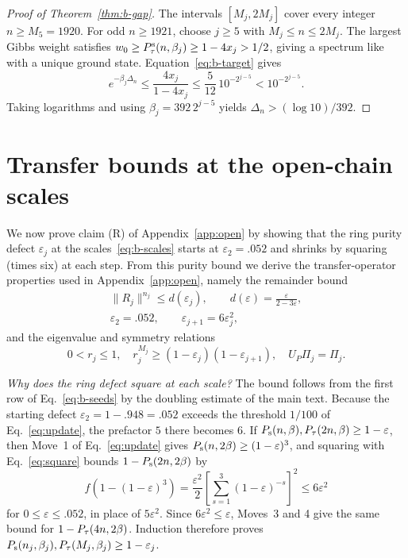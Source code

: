 \documentclass[aps,prl,reprint,amsmath,amssymb,nofootinbib,raggedbottom]{revtex4-2}
\begin{document}
\begin{proof}[Proof of Theorem~\ref{thm:b-gap}]
The intervals $[M_j,2M_j]$ cover every integer $n\ge M_5=1920$.
For odd $n\ge1921$, choose $j\ge5$ with $M_j\le n\le2M_j$.
The largest Gibbs weight satisfies $w_0\ge P_{\tau}^{\mathrm{s}}(n,\beta_j)\ge1-4x_j>1/2$,
giving a spectrum like  with a unique ground state.
Equation~\eqref{eq:b-target} gives
\begin{equation}
 e^{-\beta_j\Delta_n}\le\frac{4x_j}{1-4x_j}
 \le\frac{5}{12}\,10^{-2^{j-5}}<10^{-2^{j-5}}.
 \label{eq:b-gap-final}
\end{equation}
Taking logarithms and using $\beta_j=392\,2^{j-5}$ yields $\Delta_n>(\log10)/392$.
\end{proof}

\section{Transfer bounds at the open-chain scales}\label{app:b-periodic}
We now prove claim (R) of Appendix~\ref{app:open} by showing that the ring
purity defect $\varepsilon_j$ at the scales~\eqref{eq:b-scales} starts at
$\varepsilon_2=.052$ and shrinks by squaring (times six) at each step. From
this purity bound we derive the transfer-operator properties used in
Appendix~\ref{app:open}, namely the remainder bound
\begin{equation}
 \begin{gathered}
 \|R_j\|^{n_j}\le d(\varepsilon_j),\qquad d(\varepsilon)=\frac{\varepsilon}{2-3\varepsilon},\\
 \varepsilon_2=.052,\qquad \varepsilon_{j+1}=6\varepsilon_j^2,
 \end{gathered}
 \label{eq:b-tail}
\end{equation}
and the eigenvalue and symmetry relations
\begin{equation}
 0<r_j\le1,\quad r_j^{M_j}\ge(1-\varepsilon_j)(1-\varepsilon_{j+1}),\quad
 U_P\Pi_j=\Pi_j.
 \label{eq:b-ratios}
\end{equation}

\emph{Why does the ring defect square at each scale?} The bound follows from the
first row of Eq.~\eqref{eq:b-seeds} by the doubling estimate of the main text.
Because the starting defect $\varepsilon_2=1-.948=.052$ exceeds the threshold
$1/100$ of Eq.~\eqref{eq:update}, the prefactor $5$ there becomes $6$. If
$P_{\mathrm s}(n,\beta),P_{\tau}(2n,\beta)\ge1-\varepsilon$, then Move~1 of
Eq.~\eqref{eq:update} gives $P_{\mathrm s}(n,2\beta)\ge(1-\varepsilon)^3$, and squaring
with Eq.~\eqref{eq:square} bounds $1-P_{\mathrm s}(2n,2\beta)$ by
\begin{equation}
 f(1-(1-\varepsilon)^3)=\frac{\varepsilon^2}{2}
 \left[\sum_{s=1}^3(1-\varepsilon)^{-s}\right]^2\le6\varepsilon^2
 \label{eq:b-periodic-six}
\end{equation}
for $0\le\varepsilon\le.052$, in place of $5\varepsilon^2$. Since
$6\varepsilon^2\le\varepsilon$, Moves~3 and 4 give the same bound for
$1-P_{\tau}(4n,2\beta)$. Induction therefore proves
$P_{\mathrm s}(n_j,\beta_j),P_{\tau}(M_j,\beta_j)\ge1-\varepsilon_j$.
\end{document}
